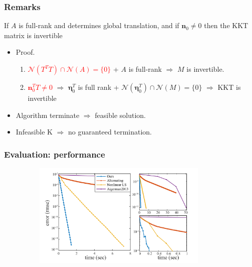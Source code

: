 \documentclass[serif,mathserif]{beamer}
\newcommand{\BOLD}[1]{\mathbf{#1}}
\newcommand{\BOLDG}[1]{\boldsymbol{#1}}
\newcommand{\TODO}[1]{\textcolor{red}{#1}}
\begin{document}
\begin{frame}
 \frametitle{Remarks}
  \begin{theo}
    If $A$ is full-rank and determines global translation, and if $\BOLD{n}_0 \neq 0$ then the KKT matrix is invertible
  \end{theo}
  \begin{itemize}
    \item Proof. 
    \begin{enumerate}
     \item \TODO{$\mathcal{N}(T^TT) \cap \mathcal{N}(A) = \{0\}$} + $A$ is full-rank $\Rightarrow$ $M$ is invertible.
     \item \TODO{$\BOLD{n}_0^TT \neq 0$} $\Rightarrow$ $\BOLDG{\eta}^T_0$ is full rank + $\mathcal{N}(\BOLDG{\eta}_0^T) \cap \mathcal{N}(M) = \{0\}$
     $\Rightarrow$ KKT is invertible
    \end{enumerate}
  \end{itemize}
  \begin{itemize}
   \item Algorithm terminate $\Rightarrow$ feasible solution.
   \item Infeasible K $\Rightarrow$ no guaranteed termination.
  \end{itemize}
\end{frame}

\begin{frame}
 \frametitle{Evaluation: performance}
 \begin{figure}
  \centering
  \includegraphics[width=10cm, height=5cm]{img/performance.png}
 \end{figure}
\end{frame}
\end{document}
